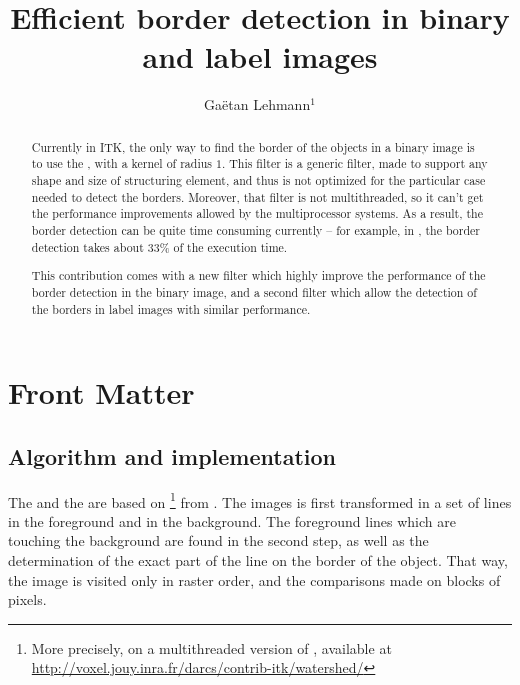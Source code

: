 \documentclass{InsightArticle}
\title{Efficient border detection in binary and label images}
\author{Ga\"etan Lehmann{$^1$}}
\begin{document}
\maketitle

\ifhtml
\chapter*{Front Matter\label{front}}
\fi


\begin{abstract}
\noindent
Currently in ITK, the only way to find the border of the objects in a binary image is to use the , with a kernel of radius $1$. This filter is a generic filter, made to support any shape and size of structuring element, and thus is not optimized for the particular case needed to detect the borders. Moreover, that filter is not multithreaded, so it can't get the performance improvements allowed by the multiprocessor systems. As a result, the border detection can be quite time consuming currently -- for example, in , the border detection takes about 33\% of the execution time.

This contribution comes with a new filter which highly improve the performance of the border detection in the binary image, and a second filter which allow the detection of the borders in label images with similar performance.

\end{abstract}


\section{Algorithm and implementation}

The  and the  are based on \footnote{More precisely, on a multithreaded version of , available at \\ \url{http://voxel.jouy.inra.fr/darcs/contrib-itk/watershed/}} from \cite{Beare:2006p42}. The images is first transformed in a set of lines in the foreground and in the background. The foreground lines which are touching the background are found in the second step, as well as the determination of the exact part of the line on the border of the object. That way, the image is visited only in raster order, and the comparisons made on blocks of pixels.
\end{document}
